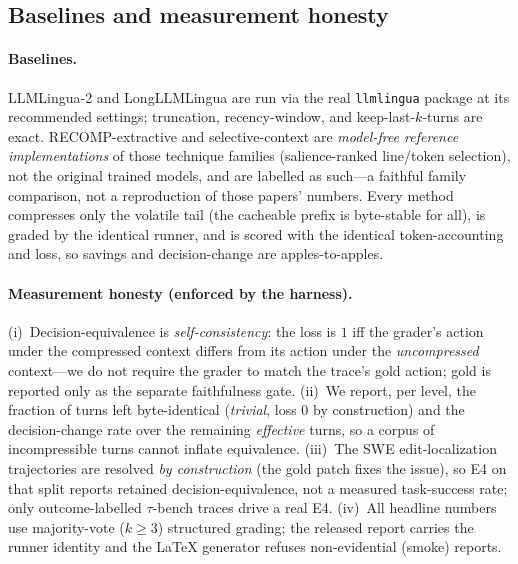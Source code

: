 \documentclass{article}
\begin{document}
\subsection{Baselines and measurement honesty}
\paragraph{Baselines.} LLMLingua-2 and LongLLMLingua are run via the real
\texttt{llmlingua} package at its recommended settings; truncation, recency-window,
and keep-last-$k$-turns are exact. RECOMP-extractive and selective-context are
\emph{model-free reference implementations} of those technique families (salience-ranked
line/token selection), not the original trained models, and are labelled as such---a
faithful family comparison, not a reproduction of those papers' numbers. Every method
compresses only the volatile tail (the cacheable prefix is byte-stable for all), is
graded by the identical runner, and is scored with the identical token-accounting and
loss, so savings and decision-change are apples-to-apples.

\paragraph{Measurement honesty (enforced by the harness).} (i)~Decision-equivalence
is \emph{self-consistency}: the loss is $1$ iff the grader's action under the
compressed context differs from its action under the \emph{uncompressed} context---we
do not require the grader to match the trace's gold action; gold is reported only as
the separate faithfulness gate. (ii)~We report, per level, the fraction of turns left
byte-identical (\emph{trivial}, loss $0$ by construction) and the decision-change rate
over the remaining \emph{effective} turns, so a corpus of incompressible turns cannot
inflate equivalence. (iii)~The SWE edit-localization trajectories are resolved
\emph{by construction} (the gold patch fixes the issue), so E4 on that split reports
retained decision-equivalence, not a measured task-success rate; only
outcome-labelled $\tau$-bench traces drive a real E4. (iv)~All headline
numbers use majority-vote ($k{\ge}3$) structured grading; the released report carries
the runner identity and the LaTeX generator refuses non-evidential (smoke) reports.
\end{document}
